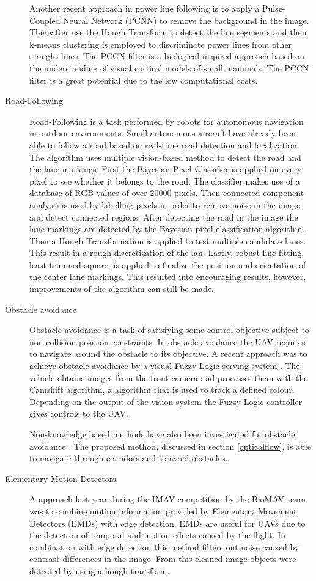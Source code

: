 \documentclass[a4paper]{article}
\begin{document}
\begin{description}
Another recent approach \cite{Zhengrong2008} in power line following is to apply a Pulse-Coupled Neural Network (PCNN) to remove the background in the image. Thereafter use the Hough Transform to detect the line segments and then k-means clustering is employed to discriminate power lines from other straight lines. The PCCN filter is a biological inspired approach based on the understanding of visual cortical models of small mammals. The PCCN filter is a great potential due to the low computational costs.

\item[Road-Following] Road-Following is a task performed by robots for autonomous navigation in outdoor environments. Small autonomous aircraft \cite{Frew2004} have already been able to follow a road based on real-time road detection and localization. The algorithm uses multiple vision-based method to detect the road and the lane markings. First the Bayesian Pixel Classifier is applied on every pixel to see whether it belongs to the road. The classifier makes use of a database of RGB values of over 20000 pixels. Then connected-component analysis is used by labelling pixels in order to remove noise in the image and detect connected regions. After detecting the road in the image the lane markings are detected by the Bayesian pixel classification algorithm. Then a Hough Transformation is applied to test multiple candidate lanes. This result in a rough discretization of the lan. Lastly, robust line fitting, least-trimmed square, is applied to finalize the position and orientation of the center lane markings. This resulted into encouraging results, however, improvements of the algorithm can still be made.

\item[Obstacle avoidance] Obstacle avoidance is a task of satisfying some control objective subject to non-collision position constraints. In obstacle avoidance the UAV requires to navigate around the obstacle to its objective. A recent approach was to achieve obstacle avoidance by a visual Fuzzy Logic serving system \cite{Miguel2012}. The vehicle obtains images from the front camera and processes them with the Camshift algorithm, a algorithm that is used to track a defined colour. Depending on the output of the vision system the Fuzzy Logic controller gives controls to the UAV.

Non-knowledge based methods have also been investigated for obstacle avoidance \cite{Jurriaans2011}. The proposed method, discussed in section \ref{opticalflow}, is able to navigate through corridors and to avoid obstacles. 

\item[Elementary Motion Detectors] A approach last year during the IMAV competition by the BioMAV team \cite{Gerke2011} was to combine motion information provided by Elementary Movement Detectors (EMDs) with edge detection. EMDs are useful for UAVs due to the detection of temporal and motion effects caused by the flight. In combination with edge detection this method filters out noise caused by contrast differences in the image. From this cleaned image  objects were detected by using a hough transform.
\end{description}
\newpage
\end{document}
